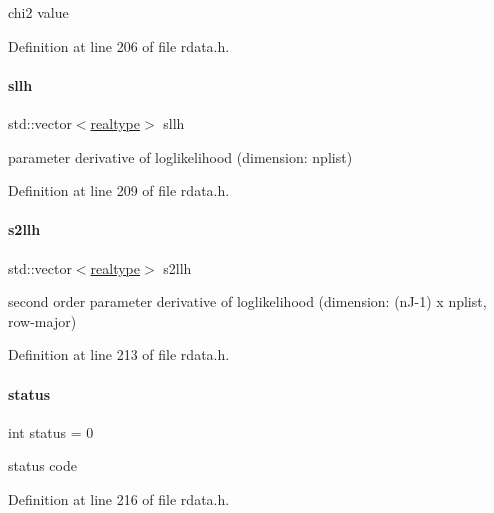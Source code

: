 chi2 value 

Definition at line 206 of file rdata.\+h.

\mbox{\label{classamici_1_1_return_data_a1696cb94c7712b468ee3e021c6df0c89}} 
\paragraph{\texorpdfstring{sllh}{sllh}}
{\footnotesize\ttfamily std\+::vector$<$\mbox{\hyperlink{namespaceamici_a1bdce28051d6a53868f7ccbf5f2c14a3}{realtype}}$>$ sllh}

parameter derivative of loglikelihood (dimension\+: nplist) 

Definition at line 209 of file rdata.\+h.

\mbox{\label{classamici_1_1_return_data_a4087bea95b64c7ecc21bb4c487b255d9}} 
\paragraph{\texorpdfstring{s2llh}{s2llh}}
{\footnotesize\ttfamily std\+::vector$<$\mbox{\hyperlink{namespaceamici_a1bdce28051d6a53868f7ccbf5f2c14a3}{realtype}}$>$ s2llh}

second order parameter derivative of loglikelihood (dimension\+: (n\+J-\/1) x nplist, row-\/major) 

Definition at line 213 of file rdata.\+h.

\mbox{\label{classamici_1_1_return_data_a6e27f49150e9a14580fb313cc2777e00}} 
\paragraph{\texorpdfstring{status}{status}}
{\footnotesize\ttfamily int status = 0}

status code 

Definition at line 216 of file rdata.\+h.

\mbox{\label{classamici_1_1_return_data_a72e833f8ef129cac553feb1167223bc3}} 
